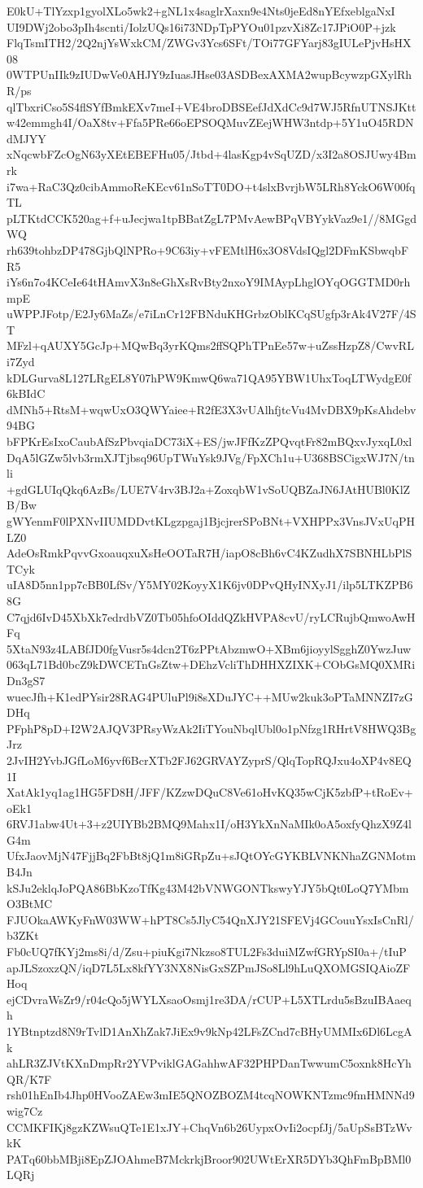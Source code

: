 E0kU+TlYzxp1gyolXLo5wk2+gNL1x4saglrXaxn9e4Nts0jeEd8nYEfxeblgaNxI
UI9DWj2obo3pIh4scnti/IolzUQs16i73NDpTpPYOu01pzvXi8Zc17JPiO0P+jzk
FlqTsmITH2/2Q2njYsWxkCM/ZWGv3Ycs6SFt/TOi77GFYarj83gIULePjvHsHX08
0WTPUnIIk9zIUDwVe0AHJY9zIuasJHse03ASDBexAXMA2wupBcywzpGXylRhR/ps
qlTbxriCso5S4flSYfBmkEXv7meI+VE4broDBSEefJdXdCc9d7WJ5RfnUTNSJKtt
w42emmgh4I/OaX8tv+Ffa5PRe66oEPSOQMuvZEejWHW3ntdp+5Y1uO45RDNdMJYY
xNqcwbFZcOgN63yXEtEBEFHu05/Jtbd+4lasKgp4vSqUZD/x3I2a8OSJUwy4Bmrk
i7wa+RaC3Qz0cibAmmoReKEcv61nSoTT0DO+t4slxBvrjbW5LRh8YckO6W00fqTL
pLTKtdCCK520ag+f+uJecjwa1tpBBatZgL7PMvAewBPqVBYykVaz9e1//8MGgdWQ
rh639tohbzDP478GjbQlNPRo+9C63iy+vFEMtlH6x3O8VdsIQgl2DFmKSbwqbFR5
iYs6n7o4KCeIe64tHAmvX3n8eGhXsRvBty2nxoY9IMAypLhglOYqOGGTMD0rhmpE
uWPPJFotp/E2Jy6MaZs/e7iLnCr12FBNduKHGrbzOblKCqSUgfp3rAk4V27F/4ST
MFzl+qAUXY5GcJp+MQwBq3yrKQms2ffSQPhTPnEe57w+uZssHzpZ8/CwvRLi7Zyd
kDLGurva8L127LRgEL8Y07hPW9KmwQ6wa71QA95YBW1UhxToqLTWydgE0f6kBIdC
dMNh5+RtsM+wqwUxO3QWYaiee+R2fE3X3vUAlhfjtcVu4MvDBX9pKsAhdebv94BG
bFPKrEsIxoCaubAfSzPbvqiaDC73iX+ES/jwJFfKzZPQvqtFr82mBQxvJyxqL0xl
DqA5lGZw5lvb3rmXJTjbsq96UpTWuYsk9JVg/FpXCh1u+U368BSCigxWJ7N/tnli
+gdGLUIqQkq6AzBs/LUE7V4rv3BJ2a+ZoxqbW1vSoUQBZaJN6JAtHUBl0KlZB/Bw
gWYenmF0lPXNvIIUMDDvtKLgzpgaj1BjcjrerSPoBNt+VXHPPx3VnsJVxUqPHLZ0
AdeOsRmkPqvvGxoauqxuXsHeOOTaR7H/iapO8cBh6vC4KZudhX7SBNHLbPlSTCyk
uIA8D5nn1pp7cBB0LfSv/Y5MY02KoyyX1K6jv0DPvQHyINXyJ1/ilp5LTKZPB68G
C7qjd6IvD45XbXk7edrdbVZ0Tb05hfoOIddQZkHVPA8cvU/ryLCRujbQmwoAwHFq
5XtaN93z4LABfJD0fgVusr5s4dcn2T6zPPtAbzmwO+XBm6jioyylSgghZ0YwzJuw
063qL71Bd0bcZ9kDWCETnGsZtw+DEhzVcliThDHHXZIXK+CObGsMQ0XMRiDn3gS7
wuecJfh+K1edPYsir28RAG4PUluPl9i8sXDuJYC++MUw2kuk3oPTaMNNZI7zGDHq
PFphP8pD+I2W2AJQV3PRsyWzAk2IiTYouNbqlUbl0o1pNfzg1RHrtV8HWQ3BgJrz
2JvIH2YvbJGfLoM6yvf6BcrXTb2FJ62GRVAYZyprS/QlqTopRQJxu4oXP4v8EQ1I
XatAk1yq1ag1HG5FD8H/JFF/KZzwDQuC8Ve61oHvKQ35wCjK5zbfP+tRoEv+oEk1
6RVJ1abw4Ut+3+z2UIYBb2BMQ9Mahx1I/oH3YkXnNaMIk0oA5oxfyQhzX9Z4lG4m
UfxJaovMjN47FjjBq2FbBt8jQ1m8iGRpZu+sJQtOYcGYKBLVNKNhaZGNMotmB4Jn
kSJu2eklqJoPQA86BbKzoTfKg43M42bVNWGONTkswyYJY5bQt0LoQ7YMbmO3BtMC
FJUOkaAWKyFnW03WW+hPT8Cs5JlyC54QnXJY21SFEVj4GCouuYsxIsCnRl/b3ZKt
Fb0cUQ7fKYj2ms8i/d/Zsu+piuKgi7Nkzso8TUL2Fs3duiMZwfGRYpSI0a+/tIuP
apJLSzoxzQN/iqD7L5Lx8kfYY3NX8NisGxSZPmJSo8Ll9hLuQXOMGSIQAioZFHoq
ejCDvraWsZr9/r04cQo5jWYLXsaoOsmj1re3DA/rCUP+L5XTLrdu5sBzuIBAaeqh
1YBtnptzd8N9rTvlD1AnXhZak7JiEx9v9kNp42LFsZCnd7cBHyUMMIx6Dl6LcgAk
ahLR3ZJVtKXnDmpRr2YVPviklGAGahhwAF32PHPDanTwwumC5oxnk8HcYhQR/K7F
rsh01hEnIb4Jhp0HVooZAEw3mIE5QNOZBOZM4tcqNOWKNTzmc9fmHMNNd9wig7Cz
CCMKFIKj8gzKZWsuQTe1E1xJY+ChqVn6b26UypxOvIi2ocpfJj/5aUpSsBTzWvkK
PATq60bbMBji8EpZJOAhmeB7MckrkjBroor902UWtErXR5DYb3QhFmBpBMl0LQRj
